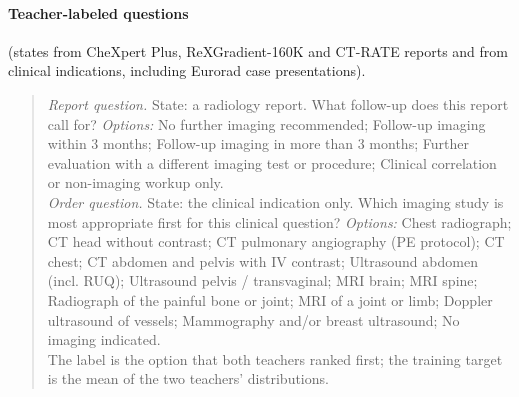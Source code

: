 \paragraph{Teacher-labeled questions} (states from CheXpert Plus, ReXGradient-160K and CT-RATE reports and from clinical indications, including Eurorad case presentations).
\begin{quote}\footnotesize\raggedright
\textit{Report question.} State: a radiology report. What follow-up does this report call for? \textit{Options:} No further imaging recommended; Follow-up imaging within 3 months; Follow-up imaging in more than 3 months; Further evaluation with a different imaging test or procedure; Clinical correlation or non-imaging workup only.\\
\textit{Order question.} State: the clinical indication only. Which imaging study is most appropriate first for this clinical question? \textit{Options:} Chest radiograph; CT head without contrast; CT pulmonary angiography (PE protocol); CT chest; CT abdomen and pelvis with IV contrast; Ultrasound abdomen (incl. RUQ); Ultrasound pelvis / transvaginal; MRI brain; MRI spine; Radiograph of the painful bone or joint; MRI of a joint or limb; Doppler ultrasound of vessels; Mammography and/or breast ultrasound; No imaging indicated.\\
The label is the option that both teachers ranked first; the training target is the mean of the two teachers' distributions.
\end{quote}
